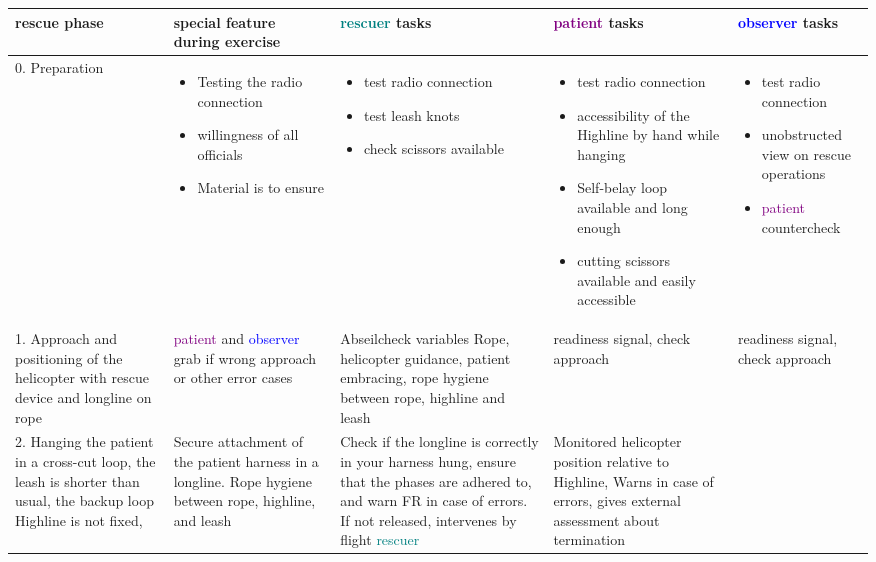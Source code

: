\documentclass[a4paper,10pt]{scrartcl}
\begin{document}
\begin{landscape}

\begin{longtable}{|p{4cm}|p{4cm}|p{4cm}|p{4cm}|p{4cm}|}
 \hline
 rescue phase & special feature during exercise & \textcolor{teal}{rescuer} tasks & \textcolor{purple}{patient} tasks & \textcolor{blue}{observer} tasks \\ 
 \hline
 \hline 
 0. Preparation & 
 \begin{itemize}
    \item Testing the radio connection
    \item willingness of all officials
    \item Material is to ensure
  \end{itemize} & 
   \begin{itemize}
    \item test radio connection
    \item test leash knots
    \item check scissors available
  \end{itemize} & 
   \begin{itemize}
    \item test radio connection
    \item accessibility of the Highline by hand while hanging
    \item Self-belay loop available and long enough
    \item  cutting scissors available and easily accessible
  \end{itemize} & 
   \begin{itemize}
    \item test radio connection
    \item unobstructed view on rescue operations
    \item \textcolor{purple}{patient} countercheck
  \end{itemize} \\
  \hline
  
 1. Approach and positioning of the helicopter with rescue device and longline on rope & \textcolor{purple}{patient} and \textcolor{blue}{observer} grab if wrong approach or other error cases & Abseilcheck variables Rope, helicopter guidance, patient embracing, rope hygiene between rope, highline and leash & readiness signal, check approach & readiness signal, check approach \\
  \hline
  
 2. Hanging the patient in a cross-cut loop, the leash is shorter than usual, the backup loop Highline is not fixed, & Secure attachment of the patient harness in a longline. Rope hygiene between rope, highline, and leash &  Check if the longline is correctly in your harness hung, ensure that the phases are adhered to, and warn FR in case of errors. If not released, intervenes by flight \textcolor{teal}{rescuer} & Monitored helicopter position relative to Highline, Warns in case of errors, gives external assessment about termination \\
  \hline
  

\end{longtable}
\end{landscape}
\end{document}
